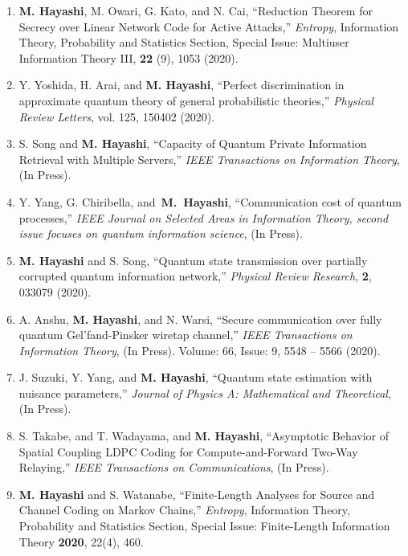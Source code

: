 \documentclass[a4paper,12pt,oneside]{article}
\begin{document}
\begin{enumerate}


\item 
\textbf{M. Hayashi}, M. Owari, G. Kato, and N. Cai,
``Reduction Theorem for Secrecy over Linear Network
Code for Active Attacks,''
{\em Entropy}, Information Theory, Probability and Statistics Section, Special Issue: Multiuser Information Theory III,  
{\bf 22} (9), 1053 (2020).

\item 
Y. Yoshida, H. Arai, and \textbf{M. Hayashi},
``Perfect discrimination in approximate quantum theory of general probabilistic theories,''
{\em Physical Review Letters}, 
vol. 125, 150402 (2020).

\item 
S. Song and \textbf{M. Hayashi},
``Capacity of Quantum Private Information Retrieval with Multiple Servers,''
{\em IEEE Transactions on Information Theory}, (In Press).

\item
Y. Yang, G. Chiribella,  and~\textbf{M.~Hayashi},
``Communication cost of quantum processes,''
{\em IEEE Journal on Selected Areas in Information Theory, second issue focuses on quantum information science},
(In Press).
 
\item
\textbf{M. Hayashi} and S. Song,
``Quantum state transmission over partially corrupted quantum information network,''
{\em Physical Review Research},  {\bf 2}, 033079 (2020).

\item
A. Anshu, \textbf{M. Hayashi}, and N. Warsi,   
``Secure communication over fully quantum Gel'fand-Pinsker wiretap channel,''
{\em IEEE Transactions on Information Theory}, (In Press).
Volume: 66, Issue: 9, 5548 -- 5566 (2020). 

\item
J. Suzuki, Y. Yang, and \textbf{M. Hayashi},
``Quantum state estimation with nuisance parameters,'' 
{\em Journal of Physics A: Mathematical and Theoretical}, 
(In Press).

\item
S. Takabe, and T. Wadayama, and \textbf{M. Hayashi}, 
``Asymptotic Behavior of Spatial Coupling LDPC Coding for Compute-and-Forward Two-Way Relaying,''
{\em IEEE Transactions on Communications},
(In Press).

\item
\textbf{M. Hayashi} and S. Watanabe,
``Finite-Length Analyses for Source and Channel Coding on Markov Chains,'' 
{\em Entropy}, Information Theory, Probability and Statistics Section, Special Issue: Finite-Length Information Theory  
{\bf 2020}, 22(4), 460.


\end{enumerate}
\end{document}
